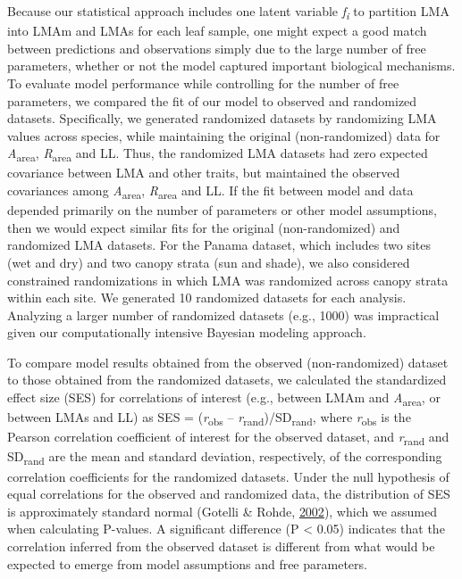 \documentclass[12pt,]{article}
\theoremstyle{definition}
\theoremstyle{definition}
\theoremstyle{definition}
\theoremstyle{remark}
\begin{document}
Because our statistical approach includes one latent variable
\emph{f\textsubscript{i}} to partition LMA into LMAm and LMAs for each
leaf sample, one might expect a good match between predictions and
observations simply due to the large number of free parameters, whether
or not the model captured important biological mechanisms. To evaluate
model performance while controlling for the number of free parameters,
we compared the fit of our model to observed and randomized datasets.
Specifically, we generated randomized datasets by randomizing LMA values
across species, while maintaining the original (non-randomized) data for
\emph{A}\textsubscript{area}, \emph{R}\textsubscript{area} and LL. Thus,
the randomized LMA datasets had zero expected covariance between LMA and
other traits, but maintained the observed covariances among
\emph{A}\textsubscript{area}, \emph{R}\textsubscript{area} and LL. If
the fit between model and data depended primarily on the number of
parameters or other model assumptions, then we would expect similar fits
for the original (non-randomized) and randomized LMA datasets. For the
Panama dataset, which includes two sites (wet and dry) and two canopy
strata (sun and shade), we also considered constrained randomizations in
which LMA was randomized across canopy strata within each site. We
generated 10 randomized datasets for each analysis. Analyzing a larger
number of randomized datasets (e.g., 1000) was impractical given our
computationally intensive Bayesian modeling approach.

To compare model results obtained from the observed (non-randomized)
dataset to those obtained from the randomized datasets, we calculated
the standardized effect size (SES) for correlations of interest (e.g.,
between LMAm and \emph{A}\textsubscript{area}, or between LMAs and LL)
as SES = (\emph{r}\textsubscript{obs} --
\emph{r}\textsubscript{rand})/SD\textsubscript{rand}, where
\emph{r}\textsubscript{obs} is the Pearson correlation coefficient of
interest for the observed dataset, and \emph{r}\textsubscript{rand} and
SD\textsubscript{rand} are the mean and standard deviation,
respectively, of the corresponding correlation coefficients for the
randomized datasets. Under the null hypothesis of equal correlations for
the observed and randomized data, the distribution of SES is
approximately standard normal (Gotelli \& Rohde,
\protect\hyperlink{ref-Gotelli2002}{2002}), which we assumed when
calculating P-values. A significant difference (P \textless{} 0.05)
indicates that the correlation inferred from the observed dataset is
different from what would be expected to emerge from model assumptions
and free parameters.
\end{document}
